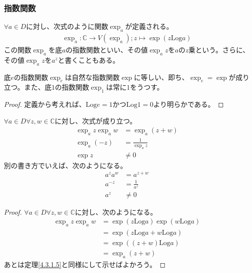\documentclass[dvipdfmx]{jsarticle}
\begin{document}
\subsubsection{指数関数}%
\begin{dfn}
$\forall a \in D$に対し、次式のように関数$\exp_{a}$が定義される。
\begin{align*}
\exp_{a}:\mathbb{C} \rightarrow V\left( \exp_{a} \right);z \mapsto \exp\left( z\mathrm{Log}a \right)
\end{align*}
この関数$\exp_{a}$を底$a$の指数関数といい、その値$\exp_{a}z$を$a$の$z$乗という。さらに、その値$\exp_{a}z$を$a^{z}$と書くこともある。
\end{dfn}
\begin{thm}\label{4.3.3.9}
底$e$の指数関数$\exp_{e}$は自然な指数関数$\exp$に等しい、即ち、$\exp_{e} = \exp$が成り立つ。また、底$1$の指数関数$\exp_{1}$は常に$1$をうつす。
\end{thm}
\begin{proof}
定義から考えれば、$\mathrm{Log}e = 1$かつ$\mathrm{Log}1 = 0$より明らかである。
\end{proof}
\begin{thm}\label{4.3.3.10}
$\forall a \in D\forall z,w \in \mathbb{C}$に対し、次式が成り立つ。
\begin{align*}
  \exp_{a}z\exp_{a}w &= \exp_{a}(z + w)\\
  \exp_{a}( - z) &= \frac{1}{\exp_{a}z}\\
  \exp z &\neq 0
\end{align*}
別の書き方でいえば、次のようになる。
\begin{align*}
  a^{z}a^{w} &= a^{z + w}\\
  a^{- z} &= \frac{1}{a^{z}}\\
  a^{z} &\neq 0
\end{align*}
\end{thm}
\begin{proof}
$\forall a \in D\forall z,w \in \mathbb{C}$に対し、次のようになる。
\begin{align*}
\exp_{a}z\exp_{a}w &= \exp\left( z\mathrm{Log}a \right)\exp\left( w\mathrm{Log}a \right)\\
&= \exp\left( z\mathrm{Log}a + w\mathrm{Log}a \right)\\
&= \exp\left( (z + w)\mathrm{Log}a \right)\\
&= \exp_{a}(z + w)
\end{align*}
あとは定理\ref{4.3.1.5}と同様にして示せばよかろう。
\end{proof}
\end{document}
